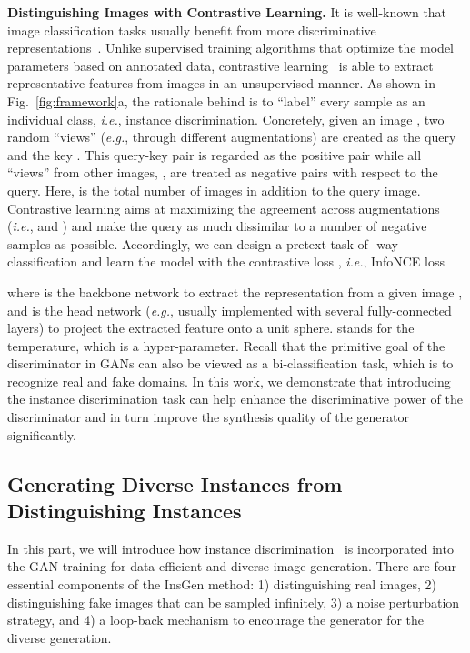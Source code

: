 \documentclass{article}
\begin{document}
\textbf{Distinguishing Images with Contrastive Learning.}
It is well-known that image classification tasks usually benefit from more discriminative representations~\cite{deng2009imagenet}.
Unlike supervised training algorithms that optimize the model parameters based on annotated data, contrastive learning~\cite{wu2018unsupervised, he2019momentum, chen2020simple, henaff2020data, bachman2019learning} is able to extract representative features from images in an unsupervised manner.
As shown in Fig.~\ref{fig:framework}a, the rationale behind is to ``label'' every sample as an individual class, \textit{i.e.}, instance discrimination.
Concretely, given an image , two random ``views'' (\textit{e.g.}, through different augmentations) are created as the query  and the key .
This query-key pair is regarded as the positive pair while all ``views'' from other images, , are treated as negative pairs with respect to the query.
Here,  is the total number of images in addition to the query image.
Contrastive learning aims at maximizing the agreement across augmentations (\textit{i.e.},  and ) and make the query as much dissimilar to a number of negative samples as possible.
Accordingly, we can design a pretext task of -way classification and learn the model with the contrastive loss , \textit{i.e.}, InfoNCE loss~\cite{oord2018representation}

where  is the backbone network to extract the representation  from a given image , and  is the head network (\textit{e.g.}, usually implemented with several fully-connected layers) to project the extracted feature onto a unit sphere.
 stands for the temperature, which is a hyper-parameter.
Recall that the primitive goal of the discriminator in GANs can also be viewed as a bi-classification task, which is to recognize real and fake domains.
In this work, we demonstrate that introducing the instance discrimination task can help enhance the discriminative power of the discriminator and in turn improve the synthesis quality of the generator significantly.


\subsection{Generating Diverse Instances from Distinguishing Instances}\label{subsec:insgen}


In this part, we will introduce how instance discrimination~\cite{wu2018unsupervised, he2019momentum} is incorporated into the GAN training for data-efficient and diverse image generation. There are four essential components of the InsGen method: 1) distinguishing real images, 2) distinguishing fake images that can be sampled infinitely, 3) a noise perturbation strategy, and 4) a loop-back mechanism to encourage the generator for the diverse generation.
\end{document}
